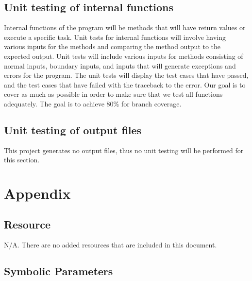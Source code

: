 \documentclass[12pt, titlepage]{article}
\begin{document}
\subsection{Unit testing of internal functions}
Internal functions of the program will be methods that will have return values or execute a specific task. Unit tests for internal functions will involve having various inputs for the methods and comparing the method output to the expected output. Unit tests will include various inputs for methods consisting of normal inputs, boundary inputs, and inputs that will generate exceptions and errors for the program. The unit tests will display the test cases that have passed, and the test cases that have failed with the traceback to the error. Our goal is to cover as much as possible in order to make sure that we test all functions adequately.
The goal is to achieve 80\% for branch coverage.
\subsection{Unit testing of output files}		
This project generates no output files, thus no unit testing will be performed for this section.





\newpage

\section{Appendix}
\subsection{Resource}
N/A. There are no added resources that are included in this document.

\subsection{Symbolic Parameters}
\end{document}
